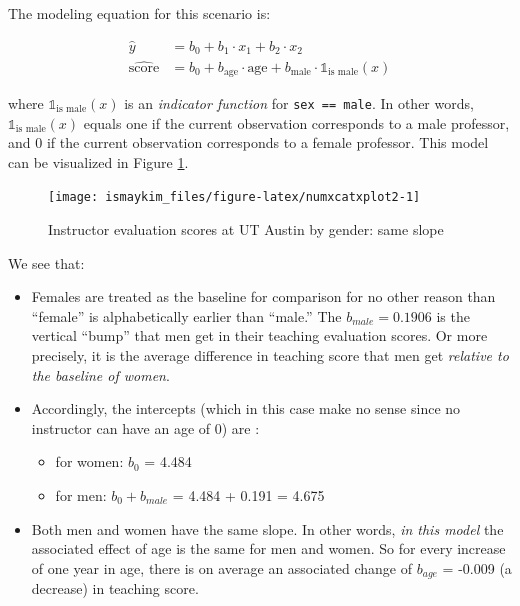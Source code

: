 \documentclass[12pt, krantz2,]{krantz}
\providecommand{\tightlist}{%
  \setlength{\itemsep}{0pt}\setlength{\parskip}{0pt}}
\begin{document}
The modeling equation for this scenario is:

\begin{align}
\widehat{y} &= b_0 + b_1 \cdot x_1 + b_2 \cdot x_2 \\
\widehat{\mbox{score}} &= b_0 + b_{\mbox{age}} \cdot \mbox{age} + b_{\mbox{male}} \cdot \mathbb{1}_{\mbox{is male}}(x)
\end{align}

where \(\mathbb{1}_{\mbox{is male}}(x)\) is an \emph{indicator function} for \texttt{sex\ ==\ male}. In other words, \(\mathbb{1}_{\mbox{is male}}(x)\) equals one if the current observation corresponds to a male professor, and 0 if the current observation corresponds to a female professor. This model can be visualized in Figure \ref{fig:numxcatxplot2}.

\begin{figure}

{\centering \texttt{[image: ismaykim\_files/figure-latex/numxcatxplot2-1]} 

}

\caption{Instructor evaluation scores at UT Austin by gender: same slope}\label{fig:numxcatxplot2}
\end{figure}

We see that:

\begin{itemize}
\tightlist
\item
  Females are treated as the baseline for comparison for no other reason than ``female'' is alphabetically earlier than ``male.'' The \(b_{male} = 0.1906\) is the vertical ``bump'' that men get in their teaching evaluation scores. Or more precisely, it is the average difference in teaching score
  that men get \emph{relative to the baseline of women}.
\item
  Accordingly, the intercepts (which in this case make no sense since no instructor can have an age of 0) are :

  \begin{itemize}
  \tightlist
  \item
    for women: \(b_0\) = 4.484
  \item
    for men: \(b_0 + b_{male}\) = 4.484 + 0.191 = 4.675
  \end{itemize}
\item
  Both men and women have the same slope. In other words, \emph{in this model} the associated effect of age is the same for men and women. So for every increase of one year in age, there is on average an associated change of \(b_{age}\) = -0.009 (a decrease) in teaching score.
\end{itemize}
\end{document}

